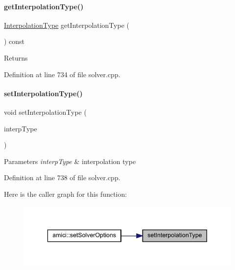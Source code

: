\paragraph{\texorpdfstring{getInterpolationType()}{getInterpolationType()}}
{\footnotesize\ttfamily \mbox{\hyperlink{namespaceamici_a8472f01c511d77bbfb981a46618ea1ea}{Interpolation\+Type}} get\+Interpolation\+Type (\begin{DoxyParamCaption}{ }\end{DoxyParamCaption}) const}

\begin{DoxyReturn}{Returns}

\end{DoxyReturn}


Definition at line 734 of file solver.\+cpp.

\mbox{\label{classamici_1_1_solver_a9d9a0a5f8cdfdb993960706c646e240f}} 
\paragraph{\texorpdfstring{setInterpolationType()}{setInterpolationType()}}
{\footnotesize\ttfamily void set\+Interpolation\+Type (\begin{DoxyParamCaption}\item[{\mbox{\hyperlink{namespaceamici_a8472f01c511d77bbfb981a46618ea1ea}{Interpolation\+Type}}}]{interp\+Type }\end{DoxyParamCaption})}


\begin{DoxyParams}{Parameters}
{\em interp\+Type} & interpolation type \\
\hline
\end{DoxyParams}


Definition at line 738 of file solver.\+cpp.

Here is the caller graph for this function\+:
\nopagebreak
\begin{figure}[H]
\begin{center}
\leavevmode
\includegraphics[width=343pt]{classamici_1_1_solver_a9d9a0a5f8cdfdb993960706c646e240f_icgraph}
\end{center}
\end{figure}
\mbox{\label{classamici_1_1_solver_ac758cf7c51f50db18ea58898623ce12c}} 
